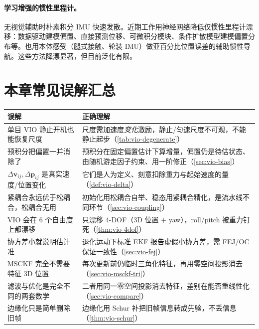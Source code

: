 \paragraph{学习增强的惯性里程计。}
无视觉辅助时朴素积分 IMU 快速发散。近期工作用神经网络降低仅惯性里程计漂移：数据驱动建模偏置、直接预测位移、可微积分模块、条件扩散模型建模偏置分布等。也用本体感受（腿式接触、轮装 IMU）做亚百分比位置误差的辅助惯性导航\cite{carlone2026handbook}。这些方法降漂显著，但目前泛化有限。

\section*{本章常见误解汇总}
\begin{table}[H]\centering\small
\begin{tabular}{p{6.2cm}p{7.2cm}}
\toprule
误解 & 正确理解 \\
\midrule
单目 VIO 静止开机也能恢复尺度 & 尺度需加速度\emph{变化}激励，静止/匀速尺度不可观，不能静止起步（\cref{tab:vio-degenerate}） \\
预积分把偏置一并消除了 & 预积分在固定偏置估计下算增量，偏置仍是待估状态、由随机游走因子约束、用一阶修正（\cref{sec:vio-bias}） \\
$\Delta\mathbf{v}_{ij},\Delta\mathbf{p}_{ij}$ 是真实速度/位置变化 & 它们是人为定义、刻意扣除重力与起始速度的量（\cref{def:vio-delta}） \\
紧耦合永远优于松耦合，松耦合无用 & 初始化用松耦合自举、稳态用紧耦合精化，是流水线不同环节（\cref{sec:vio-coupling}） \\
VIO 会在 $6$ 个自由度上都漂移 & 只漂移 $4$-DOF（$3$D 位置 $+$ yaw），roll/pitch 被重力钉死（\cref{thm:vio-4dof}） \\
协方差小就说明估计准 & 退化运动下标准 EKF 报告虚假小协方差，需 FEJ/OC 保证一致性（\cref{sec:vio-fej}） \\
MSCKF 完全不需要特征 $3$D 位置 & 每次更新前仍临时三角化特征，再用零空间投影消去（\cref{sec:vio-msckf-tri}） \\
滤波与优化是完全不同的两套数学 & 二者用同一零空间投影消去特征，差别在能否重线性化（\cref{sec:vio-compare}） \\
边缘化只是简单删除旧帧 & 边缘化用 Schur 补把旧帧信息转成先验，不丢信息（\cref{thm:vio-schur}） \\
\bottomrule
\end{tabular}
\end{table}

